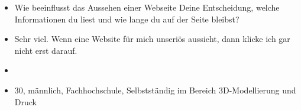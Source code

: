 {\begin{itemize}[]
                  Man sieht gut wie Artikel zusammenhängen und diese Möglichkeit gibt es bei der Liste nicht.
            \item {} Wie beeinflusst das Aussehen einer Webseite Deine Entscheidung, welche Informationen du liest und wie lange du auf der Seite bleibst?
            \item {} Sehr viel.
                  Wenn eine Website für mich unseriös aussieht, dann klicke ich gar nicht erst darauf.
            \item {}
            \item {} 30, männlich, Fachhochschule, Selbstständig im Bereich 3D-Modellierung und Druck
      \end{itemize}}
\nolinenumbers
